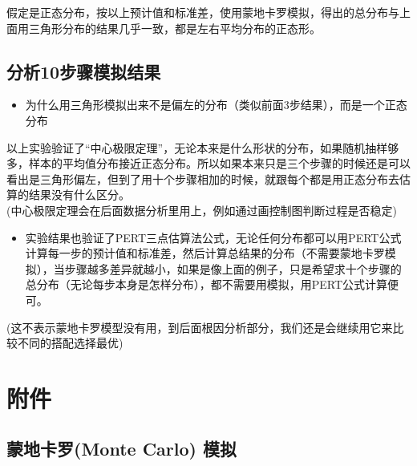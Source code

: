 假定是正态分布，按以上预计值和标准差，使用蒙地卡罗模拟，得出的总分布与上面用三角形分布的结果几乎一致，都是左右平均分布的正态形。

\hypertarget{ux5206ux679010ux6b65ux9aa4ux6a21ux62dfux7ed3ux679c}{%
\subsection{分析10步骤模拟结果}\label{ux5206ux679010ux6b65ux9aa4ux6a21ux62dfux7ed3ux679c}}

\begin{itemize}
\tightlist
\item
  为什么用三角形模拟出来不是偏左的分布（类似前面3步结果），而是一个正态分布
\end{itemize}

\begin{description}
\tightlist
\item[]
以上实验验证了``中心极限定理''，无论本来是什么形状的分布，如果随机抽样够多，样本的平均值分布接近正态分布。所以如果本来只是三个步骤的时候还是可以看出是三角形偏左，但到了用十个步骤相加的时候，就跟每个都是用正态分布去估算的结果没有什么区分。\\

(中心极限定理会在后面数据分析里用上，例如通过画控制图判断过程是否稳定)\\
\end{description}

\begin{itemize}
\tightlist
\item
  实验结果也验证了PERT三点估算法公式，无论任何分布都可以用PERT公式计算每一步的预计值和标准差，然后计算总结果的分布（不需要蒙地卡罗模拟），当步骤越多差异就越小，如果是像上面的例子，只是希望求十个步骤的总分布（无论每步本身是怎样分布），都不需要用模拟，用PERT公式计算便可。\\
\end{itemize}

\begin{description}
\tightlist
\item[]
(这不表示蒙地卡罗模型没有用，到后面根因分析部分，我们还是会继续用它来比较不同的搭配选择最优)
\end{description}

\hypertarget{ux9644ux4ef6}{%
\section{附件}\label{ux9644ux4ef6}}

\hypertarget{ux8499ux5730ux5361ux7f57monte-carlo-ux6a21ux62df}{%
\subsection{蒙地卡罗(Monte Carlo)
模拟}\label{ux8499ux5730ux5361ux7f57monte-carlo-ux6a21ux62df}}

